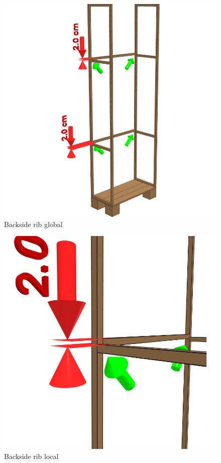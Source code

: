 \documentclass{article}
\begin{document}
\begin{figure}[h!]
    \centering
    \includegraphics[width=\textwidth]{scene 5 - achterrib a.png}
    \caption{Backside rib global}
\end{figure}

\begin{figure}[h!]
    \centering
    \includegraphics[width=\textwidth]{scene 5 - achterrib b.png}
    \caption{Backside rib local}
\end{figure}
\end{document}
